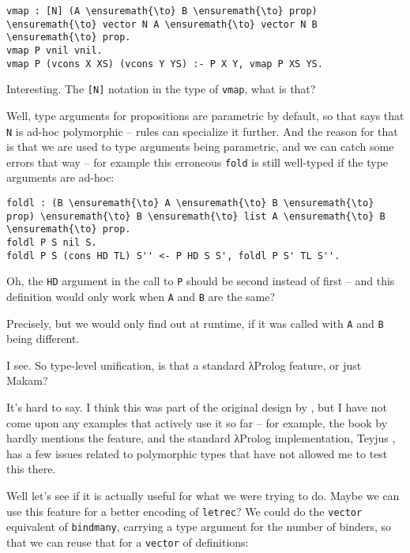\begin{verbatim}
vmap : [N] (A \ensuremath{\to} B \ensuremath{\to} prop) \ensuremath{\to} vector N A \ensuremath{\to} vector N B \ensuremath{\to} prop.
vmap P vnil vnil.
vmap P (vcons X XS) (vcons Y YS) :- P X Y, vmap P XS YS.
\end{verbatim}

\heroSTUDENT{} Interesting. The \texttt{{[}N{]}} notation in the type of
\texttt{vmap}, what is that?

\heroADVISOR{} Well, type arguments for propositions are parametric by
default, so that says that \texttt{N} is ad-hoc polymorphic -- rules can
specialize it further. And the reason for that is that we are used to
type arguments being parametric, and we can catch some errors that way
-- for example this erroneous \texttt{fold} is still well-typed if the
type arguments are ad-hoc:

\begin{verbatim}
foldl : (B \ensuremath{\to} A \ensuremath{\to} B \ensuremath{\to} prop) \ensuremath{\to} B \ensuremath{\to} list A \ensuremath{\to} B \ensuremath{\to} prop.
foldl P S nil S.
foldl P S (cons HD TL) S'' <- P HD S S', foldl P S' TL S''.
\end{verbatim}

\heroSTUDENT{} Oh, the \texttt{HD} argument in the call to \texttt{P} should
be second instead of first -- and this definition would only work when
\texttt{A} and \texttt{B} are the same?

\heroADVISOR{} Precisely, but we would only find out at runtime, if it was
called with \texttt{A} and \texttt{B} being different.

\heroSTUDENT{} I see. So type-level unification, is that a standard \foreignlanguage{greek}{λ}Prolog
feature, or just Makam?

\heroADVISOR{} It's hard to say. I think this was part of the original design
by \citet{miller1988overview}, but I have not come upon any examples
that actively use it so far -- for example, the book by
\citet{miller2012programming} hardly mentions the feature, and the
standard \foreignlanguage{greek}{λ}Prolog implementation, Teyjus \citet{nadathur1999system}, has
a few issues related to polymorphic types that have not allowed me to
test this there.

\heroSTUDENT{} Well let's see if it is actually useful for what we were trying
to do. Maybe we can use this feature for a better encoding of
\texttt{letrec}? We could do the \texttt{vector} equivalent of
\texttt{bindmany}, carrying a type argument for the number of binders,
so that we can reuse that for a \texttt{vector} of definitions:


